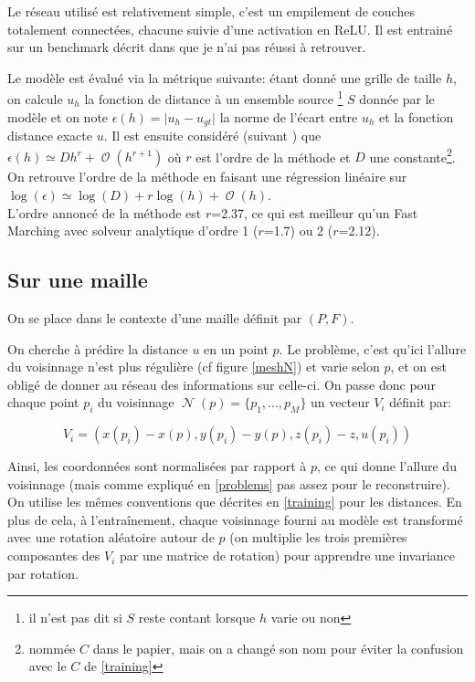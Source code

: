 \documentclass[11pt]{article} %
\DeclareMathOperator\Oo{\mathcal{O}}
\DeclareMathOperator\Nn{\mathcal{N}}
\begin{document}
Le réseau utilisé est relativement simple, c'est un empilement de couches totalement connectées, chacune suivie d'une activation en ReLU. Il est entrainé sur un benchmark décrit dans \cite{GridBenchmark} que je n'ai pas réussi à retrouver. 

Le modèle est évalué via la métrique suivante: étant donné une grille de taille $h$, on calcule $u_h$ la fonction de distance à un ensemble source \footnote{il n'est pas dit si $S$ reste contant lorsque $h$ varie ou non} $S$ donnée par le modèle et on note $\epsilon(h) = \vert u_h - u_{gt} \vert$ la norme de l'écart entre $u_h$ et la fonction distance exacte $u$. Il est ensuite considéré (suivant \cite{ErrorOnGrid}) que $\epsilon(h) \simeq Dh^r + \Oo(h^{r+1})$ où $r$ est l'ordre de la méthode et $D$ une constante\footnote{nommée $C$ dans le papier, mais on a changé son nom pour éviter la confusion avec le $C$ de \ref{training}}. On retrouve l'ordre de la méthode en faisant une régression linéaire sur $\log(\epsilon) \simeq \log(D) + r\log(h) + \Oo(h)$.\\
L'ordre annoncé de la méthode est $r$=2.37, ce qui est meilleur qu'un Fast Marching avec solveur analytique d'ordre 1 ($r$=1.7) ou 2 ($r$=2.12).

\subsection{Sur une maille}\label{mesh}

On se place dans le contexte d'une maille définit par $(P, F)$.

On cherche à prédire la distance $u$ en un point $p$. Le problème, c'est qu'ici l'allure du voisinnage n'est plus régulière (cf figure \ref{meshN}) et varie selon $p$, et on est obligé de donner au réseau des informations sur celle-ci. On passe donc pour chaque point $p_i$ du voisinnage $\Nn(p) = \lbrace p_1, \dots, p_M \rbrace$ un vecteur $V_i$ définit par:

$$
V_i = \left( x(p_i) - x(p), y(p_i) - y(p), z(p_i) - z, u(p_i) \right)
$$

Ainsi, les coordonnées sont normalisées par rapport à $p$, ce qui donne l'allure du voisinnage (mais comme expliqué en \ref{problems} pas assez pour le reconstruire). On utilise les mêmes conventions que décrites en \ref{training} pour les distances. En plus de cela, à l'entraînement, chaque voisinnage fourni au modèle est transformé avec une rotation aléatoire autour de $p$ (on multiplie les trois premières composantes des $V_i$ par une matrice de rotation) pour apprendre une invariance par rotation. 
\end{document}
